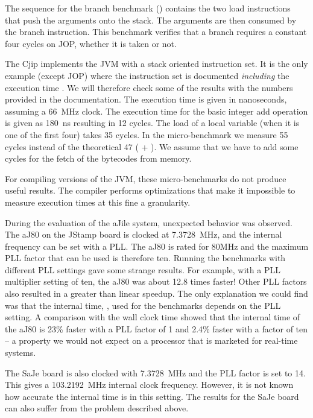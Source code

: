 The sequence for the branch benchmark () contains
the two load instructions that push the arguments onto the stack.
The arguments are then consumed by the branch instruction. This
benchmark verifies that a branch requires a constant four cycles on
JOP, whether it is taken or not.

The Cjip implements the JVM with a stack oriented instruction set. It
is the only example (except JOP) where the instruction set is
documented \emph{including} the execution time \cite{CjipRef}. We
will therefore check some of the results with the numbers provided in
the documentation. The execution time is given in nanoseconds,
assuming a 66~MHz clock. The execution time for the basic integer add
operation is given as 180~ns resulting in 12 cycles. The load of a
local variable (when it is one of the first four) takes 35 cycles. In
the micro-benchmark we measure 55 cycles instead of the theoretical
47 ( + ). We assume that we have to add
some cycles for the fetch of the bytecodes from memory.

For compiling versions of the JVM, these micro-benchmarks do not
produce useful results. The compiler performs optimizations that
make it impossible to measure execution times at this fine a
granularity.

During the evaluation of the aJile system, unexpected behavior was
observed. The aJ80 on the JStamp board is clocked at 7.3728~MHz, and
the internal frequency can be set with a PLL. The aJ80 is rated for
80MHz and the maximum PLL factor that can be used is therefore ten.
Running the benchmarks with different PLL settings gave some strange
results. For example, with a PLL multiplier setting of ten, the aJ80
was about 12.8 times faster! Other PLL factors also resulted in a
greater than linear speedup. The only explanation we could find was
that the internal time, , used for
the benchmarks depends on the PLL setting. A comparison with the wall
clock time showed that the internal time of the aJ80 is 23\% faster
with a PLL factor of 1 and 2.4\% faster with a factor of ten -- a
property we would not expect on a processor that is marketed for
real-time systems.

The SaJe board is also clocked with 7.3728~MHz and the PLL factor is
set to 14. This gives a 103.2192~MHz internal clock frequency.
However, it is not known how accurate the internal time is in this
setting. The results for the SaJe board can also suffer from the
problem described above.

